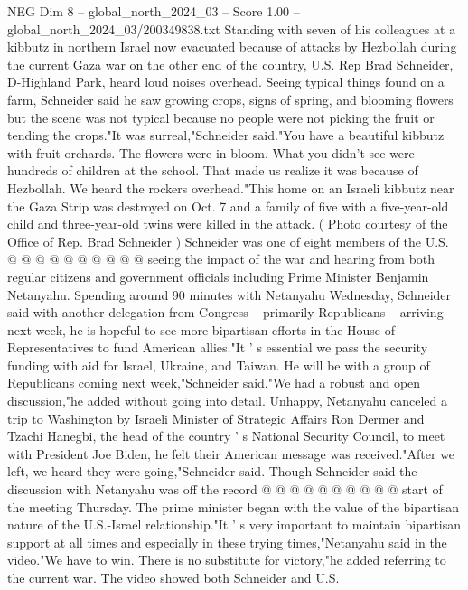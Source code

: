 \begin{textsample}{NEG Dim 8 – global\_north\_2024\_03 – Score 1.00 – global\_north\_2024\_03/200349838.txt}  \label{ex:f8_neg_446}
Standing with seven of his colleagues at a kibbutz in northern Israel now evacuated because of attacks by Hezbollah during the current Gaza war on the other end of the country, U.S.
Rep Brad Schneider, D-Highland Park, heard loud noises overhead.
Seeing typical things found on a farm, Schneider said he saw growing crops, signs of spring, and blooming flowers but the scene was not typical because no people were not picking the fruit or tending the crops."It was surreal,"Schneider said."You have a beautiful kibbutz with fruit orchards.
The flowers were in bloom.
What you didn't see were hundreds of children at the school.
That made us realize it was because of Hezbollah.
We heard the rockers overhead."This home on an Israeli kibbutz near the Gaza Strip was destroyed on Oct. 7 and a family of five with a five-year-old child and three-year-old twins were killed in the attack. ( Photo courtesy of the Office of Rep.
Brad Schneider ) Schneider was one of eight members of the U.S. @ @ @ @ @ @ @ @ @ @ seeing the impact of the war and hearing from both regular citizens and government officials including Prime Minister Benjamin Netanyahu.
Spending around 90 minutes with Netanyahu Wednesday, Schneider said with another delegation from Congress -- primarily Republicans -- arriving next week, he is hopeful to see more bipartisan efforts in the House of Representatives to fund American allies."It ' s essential we pass the security funding with aid for Israel, Ukraine, and Taiwan.
He will be with a group of Republicans coming next week,"Schneider said."We had a robust and open discussion,"he added without going into detail.
Unhappy, Netanyahu canceled a trip to Washington by Israeli Minister of Strategic Affairs Ron Dermer and Tzachi Hanegbi, the head of the country ' s National Security Council, to meet with President Joe Biden, he felt their American message was received."After we left, we heard they were going,"Schneider said.
Though Schneider said the discussion with Netanyahu was off the record @ @ @ @ @ @ @ @ @ @ start of the meeting Thursday.
The prime minister began with the value of the bipartisan nature of the U.S.-Israel relationship."It ' s very important to maintain bipartisan support at all times and especially in these trying times,"Netanyahu said in the video."We have to win.
There is no substitute for victory,"he added referring to the current war.
The video showed both Schneider and U.S.

\end{textsample}
